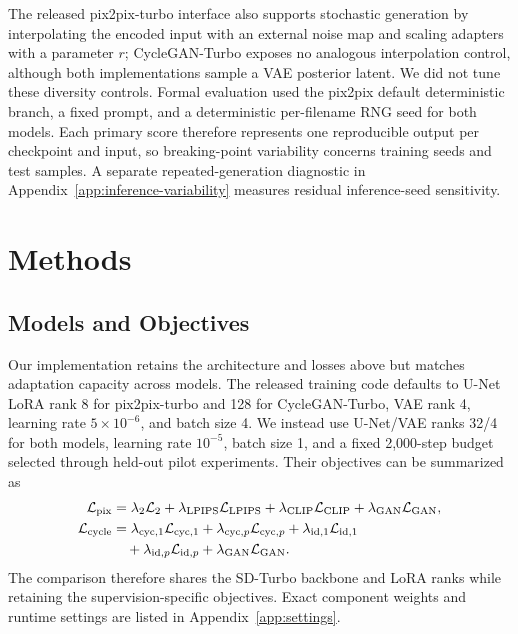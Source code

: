 \documentclass{article}
\begin{document}
The released pix2pix-turbo interface also supports stochastic generation by interpolating the encoded input with an external noise map and scaling adapters with a parameter $r$; CycleGAN-Turbo exposes no analogous interpolation control, although both implementations sample a VAE posterior latent. We did not tune these diversity controls. Formal evaluation used the pix2pix default deterministic branch, a fixed prompt, and a deterministic per-filename RNG seed for both models. Each primary score therefore represents one reproducible output per checkpoint and input, so breaking-point variability concerns training seeds and test samples. A separate repeated-generation diagnostic in Appendix~\ref{app:inference-variability} measures residual inference-seed sensitivity.

\section{Methods}

\subsection{Models and Objectives}

Our implementation retains the architecture and losses above but matches adaptation capacity across models. The released training code defaults to U-Net LoRA rank 8 for pix2pix-turbo and 128 for CycleGAN-Turbo, VAE rank 4, learning rate $5\times10^{-6}$, and batch size 4. We instead use U-Net/VAE ranks 32/4 for both models, learning rate $10^{-5}$, batch size 1, and a fixed 2,000-step budget selected through held-out pilot experiments. Their objectives can be summarized as
\begin{align}
\mathcal{L}_{\mathrm{pix}}
  &= \lambda_{2}\mathcal{L}_{2}
   + \lambda_{\mathrm{LPIPS}}\mathcal{L}_{\mathrm{LPIPS}}
   + \lambda_{\mathrm{CLIP}}\mathcal{L}_{\mathrm{CLIP}}
   + \lambda_{\mathrm{GAN}}\mathcal{L}_{\mathrm{GAN}}, \\
\mathcal{L}_{\mathrm{cycle}}
  &= \lambda_{\mathrm{cyc},1}\mathcal{L}_{\mathrm{cyc},1}
   + \lambda_{\mathrm{cyc},p}\mathcal{L}_{\mathrm{cyc},p}
   + \lambda_{\mathrm{id},1}\mathcal{L}_{\mathrm{id},1} \notag \\
  &\quad
   + \lambda_{\mathrm{id},p}\mathcal{L}_{\mathrm{id},p}
   + \lambda_{\mathrm{GAN}}\mathcal{L}_{\mathrm{GAN}}.
\end{align}
The comparison therefore shares the SD-Turbo backbone and LoRA ranks while retaining the supervision-specific objectives. Exact component weights and runtime settings are listed in Appendix~\ref{app:settings}.
\end{document}
